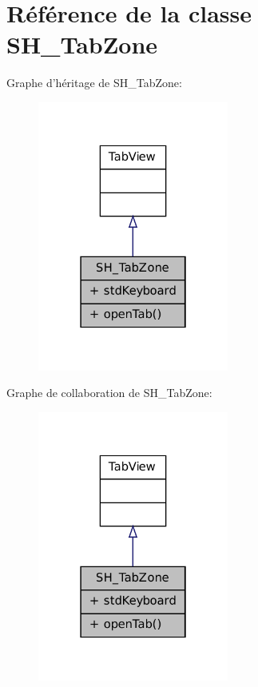 \hypertarget{classSH__TabZone}{\section{Référence de la classe S\-H\-\_\-\-Tab\-Zone}
\label{classSH__TabZone}
}


Graphe d'héritage de S\-H\-\_\-\-Tab\-Zone\-:\nopagebreak
\begin{figure}[H]
\begin{center}
\leavevmode
\includegraphics[width=178pt]{classSH__TabZone__inherit__graph}
\end{center}
\end{figure}


Graphe de collaboration de S\-H\-\_\-\-Tab\-Zone\-:\nopagebreak
\begin{figure}[H]
\begin{center}
\leavevmode
\includegraphics[width=178pt]{classSH__TabZone__coll__graph}
\end{center}
\end{figure}
